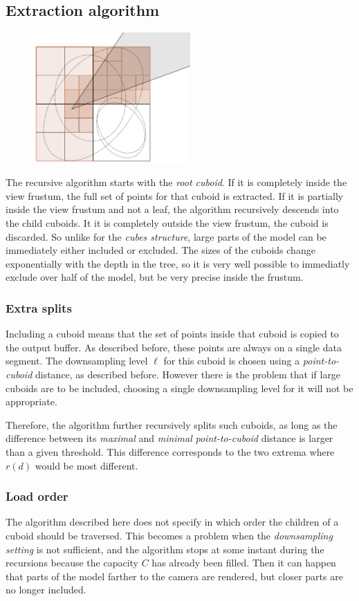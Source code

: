 \documentclass[a4paper,10pt,abstracton,notitlepage]{scrreprt}
\begin{document}
\subsection{Extraction algorithm}
\begin{figure}
\includegraphics[width=6cm]{octree.png}
\label{fig:octree}
\end{figure}
The recursive algorithm starts with the \emph{root cuboid}. If it is completely inside the view frustum, the full set of points for that cuboid is extracted. If it is partially inside the view frustum and not a leaf, the algorithm recursively descends into the child cuboids. It it is completely outside the view frustum, the cuboid is discarded. So unlike for the \emph{cubes structure}, large parts of the model can be immediately either included or excluded. The sizes of the cuboids change exponentially with the depth in the tree, so it is very well possible to immediatly exclude over half of the model, but be very precise inside the frustum.

\subsubsection{Extra splits}
Including a cuboid means that the set of points inside that cuboid is copied to the output buffer. As described before, these points are always on a single data segment. The downsampling level $\ell$ for this cuboid is chosen using a \emph{point-to-cuboid} distance, as described before. However there is the problem that if large cuboids are to be included, choosing a single downsampling level for it will not be appropriate.

Therefore, the algorithm further recursively splits such cuboids, as long as the difference between its \emph{maximal} and \emph{minimal} \emph{point-to-cuboid} distance is larger than a given threshold. This difference corresponds to the two extrema where $r(d)$ would be most different.

\subsubsection{Load order}
The algorithm described here does not specify in which order the children of a cuboid should be traversed. This becomes a problem when the \emph{downsampling setting} is not sufficient, and the algorithm stops at some instant during the recursions because the capacity $C$ has already been filled. Then it can happen that parts of the model farther to the camera are rendered, but closer parts are no longer included.
\end{document}
